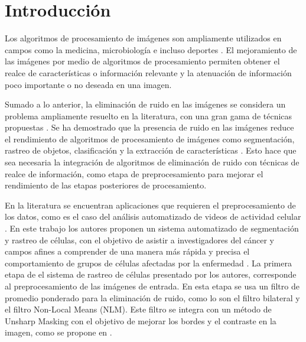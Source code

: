 
\chapter{Introducción}
\label{chp:intro}

Los algoritmos de procesamiento de im\'agenes son ampliamente utilizados en campos como la medicina, microbiolog\'ia e incluso deportes \cite{Aggarwal2011,	Ekin2003, Fils_BfilCells_2008}. El mejoramiento de las im\'agenes por medio de algoritmos de procesamiento permiten obtener el realce de caracter\'isticas o informaci\'on relevante y la atenuaci\'on de informaci\'on poco importante o no deseada en una imagen. 

Sumado a lo anterior, la eliminaci\'on de ruido en las im\'agenes se considera un problema ampliamente resuelto en la literatura, con una gran gama de t\'ecnicas propuestas \cite{edgpreservefilter}. Se ha demostrado que la presencia de ruido en las im\'agenes reduce el rendimiento de algoritmos de procesamiento de im\'agenes como segmentaci\'on, rastreo de objetos, clasificaci\'on y la extracci\'on de caracter\'isticas \cite{BF2014,IMPROVESEGMENTATIONBF,CONCAPAN2016}. Esto hace que sea necesaria la integraci\'on de algoritmos de eliminaci\'on de ruido con t\'ecnicas de realce de informaci\'on, como etapa de preprocesamiento para mejorar el rendimiento de las etapas posteriores de procesamiento.  

En la literatura se encuentran aplicaciones que requieren el preprocesamiento de los datos, como es el caso del an\'alisis automatizado de videos de actividad celular \cite{saenz2015deceived}. En este trabajo los autores proponen un sistema automatizado de segmentaci\'on y rastreo de c\'elulas, con el objetivo de asistir a investigadores del c\'ancer y campos afines a comprender de una  manera m\'as r\'apida y precisa el comportamiento de grupos de c\'elulas afectadas por la enfermedad \cite{saenz2015deceived}. La primera etapa de el sistema de rastreo de c\'elulas presentado por los autores, corresponde al preprocesamiento de las im\'agenes de entrada. En esta etapa se usa un filtro de promedio ponderado para la eliminaci\'on de ruido, como lo son el filtro bilateral y el filtro Non-Local Means (NLM). Este filtro se integra con un m\'etodo de Unsharp Masking con el objetivo de mejorar los bordes y el contraste en la imagen, como se propone en \cite{calderon2015dewaff}. 

